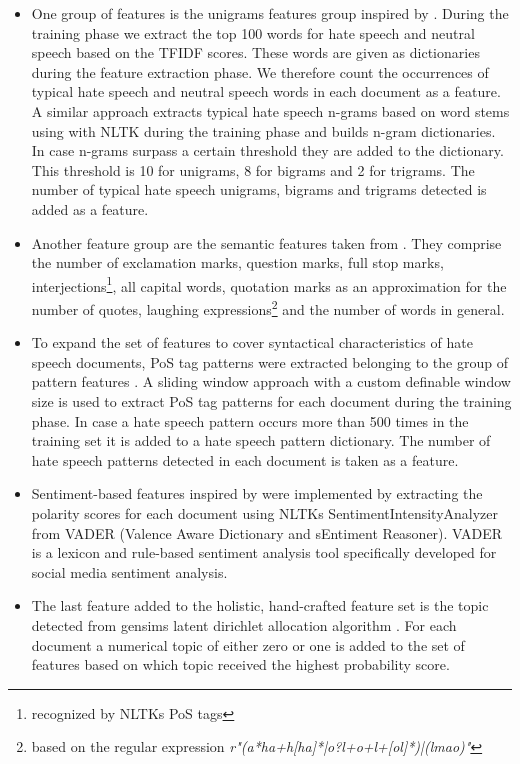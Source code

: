 \begin{itemize}
	\item One group of features is the unigrams features group inspired by \cite{ThomasDavidson2020, Oriola.2020, Fortuna2018, Gaydhani2018, Malmasi2017}. During the training phase we extract the top 100 words for hate speech and neutral speech based on the TFIDF scores. These words are given as dictionaries during the feature extraction phase. We therefore count the occurrences of typical hate speech and neutral speech words in each document as a feature. A similar approach extracts typical hate speech n-grams based on word stems using with NLTK during the training phase and builds n-gram dictionaries. In case n-grams surpass a certain threshold they are added to the dictionary. This threshold is 10 for unigrams, 8 for bigrams and 2 for trigrams. The number of typical hate speech unigrams, bigrams and trigrams detected is added as a feature. 
	
	\item Another feature group are the semantic features taken from \cite{ThomasDavidson2020, Watanabe2018}. They comprise the number of exclamation marks, question marks, full stop marks, interjections\footnote{recognized by NLTKs PoS tags}, all capital words, quotation marks as an approximation for the number of quotes, laughing expressions\footnote{based on the regular expression \textit{r"(a*ha+h[ha]*|o?l+o+l+[ol]*)|(lmao)"}} and the number of words in general. 
	
	\item To expand the set of features to cover syntactical characteristics of hate speech documents, PoS tag patterns were extracted belonging to the group of pattern features \cite{Oriola.2020, Fortuna2018}. A sliding window approach with a custom definable window size is used to extract PoS tag patterns for each document during the training phase. In case a hate speech pattern occurs more than 500 times in the training set it is added to a hate speech pattern dictionary. The number of hate speech patterns detected in each document is taken as a feature.
	
	\item Sentiment-based features inspired by \cite{Oriola.2020, Fortuna2018} were implemented by extracting the polarity scores for each document using NLTKs SentimentIntensityAnalyzer from VADER (Valence Aware Dictionary and sEntiment Reasoner). VADER is a lexicon and rule-based sentiment analysis tool specifically developed for social media sentiment analysis. 
	
	\item The last feature added to the holistic, hand-crafted feature set is the topic detected from gensims latent dirichlet allocation algorithm \cite{Fortuna2018}. For each document a numerical topic of either zero or one is added to the set of features based on which topic received the highest probability score. 
\end{itemize}

